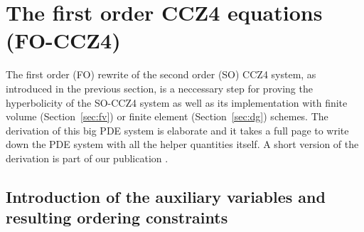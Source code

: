 \section{The first order CCZ4 equations (FO-CCZ4)}\label{sec:fo-ccz4}
The first order (FO) rewrite of the second order (SO) CCZ4 system, as
introduced in the previous section, is a neccessary step for proving the
hyperbolicity of the SO-CCZ4 system as well as its implementation with
finite volume (Section~\vref{sec:fv}) or finite element
(Section~\vref{sec:dg}) schemes. The derivation of this big PDE system
is elaborate and it takes a full page to write down the PDE system with
all the helper quantities itself. A short version of the derivation
is part of our publication \cite{Dumbser2017}.

\subsection[Auxilliary variables, ordering constraints]
  {Introduction of the auxiliary variables and resulting ordering constraints}

